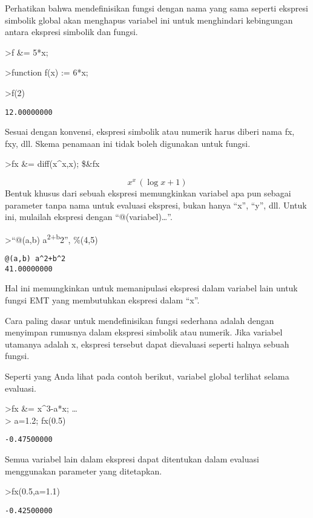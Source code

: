 \documentclass[
]{book}
\begin{document}
Perhatikan bahwa mendefinisikan fungsi dengan nama yang sama seperti ekspresi simbolik global akan menghapus variabel ini untuk menghindari kebingungan antara ekspresi simbolik dan fungsi.

\textgreater f \&= 5*x;

\textgreater function f(x) := 6*x;

\textgreater f(2)

\begin{verbatim}
12.00000000 
\end{verbatim}

Sesuai dengan konvensi, ekspresi simbolik atau numerik harus diberi nama fx, fxy, dll. Skema penamaan ini tidak boleh digunakan untuk fungsi.

\textgreater fx \&= diff(x\^{}x,x); \$\&fx

\[x^{x}\,\left(\log x+1\right)\]Bentuk khusus dari sebuah ekspresi memungkinkan variabel apa pun sebagai parameter tanpa nama untuk evaluasi ekspresi, bukan hanya ``x'', ``y'', dll. Untuk ini, mulailah ekspresi dengan ``@(variabel)\ldots{}''.

\textgreater{}``@(a,b) a\textsuperscript{2+b}2'', \%(4,5)

\begin{verbatim}
@(a,b) a^2+b^2
41.00000000 
\end{verbatim}

Hal ini memungkinkan untuk memanipulasi ekspresi dalam variabel lain untuk fungsi EMT yang membutuhkan ekspresi dalam ``x''.

Cara paling dasar untuk mendefinisikan fungsi sederhana adalah dengan menyimpan rumusnya dalam ekspresi simbolik atau numerik. Jika variabel utamanya adalah x, ekspresi tersebut dapat dievaluasi seperti halnya sebuah fungsi.

Seperti yang Anda lihat pada contoh berikut, variabel global terlihat selama evaluasi.

\textgreater fx \&= x\^{}3-a*x; \ldots{}\\
\textgreater{} a=1.2; fx(0.5)

\begin{verbatim}
-0.47500000 
\end{verbatim}

Semua variabel lain dalam ekspresi dapat ditentukan dalam evaluasi menggunakan parameter yang ditetapkan.

\textgreater fx(0.5,a=1.1)

\begin{verbatim}
-0.42500000 
\end{verbatim}
\end{document}
